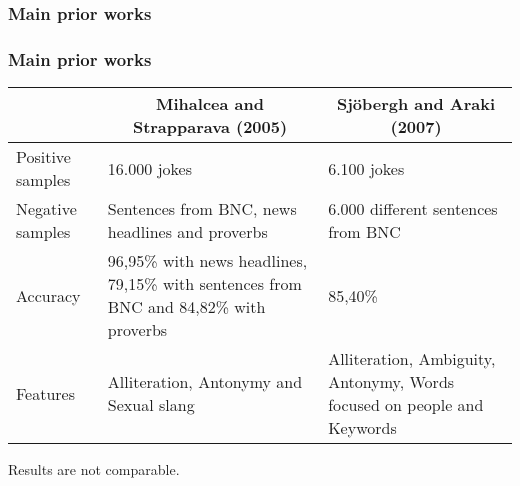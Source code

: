 \subsubsection{Main prior works}

\begin{frame}
    \frametitle{Main prior works}

    \begin{center}
        \scriptsize
        \begin{tabular}{>{\centering\arraybackslash}m{1.9cm} m{4cm} m{4cm}}
            & \multicolumn{1}{c}{Mihalcea and Strapparava (2005)} & \multicolumn{1}{c}{Sjöbergh and Araki (2007)} \\
            \midrule
            Positive samples & 16.000 jokes & 6.100 jokes \\
            \midrule
            Negative samples & Sentences from BNC, news headlines and proverbs & 6.000 different sentences from BNC \\
            \midrule
            Accuracy & 96,95\% with news headlines, 79,15\% with sentences from BNC and 84,82\% with proverbs & 85,40\% \\
            \midrule
            Features & Alliteration, Antonymy and Sexual slang & Alliteration, Ambiguity, Antonymy, Words focused on people and Keywords
        \end{tabular}

        \vfill

        Results are not comparable.
    \end{center}
\end{frame}

